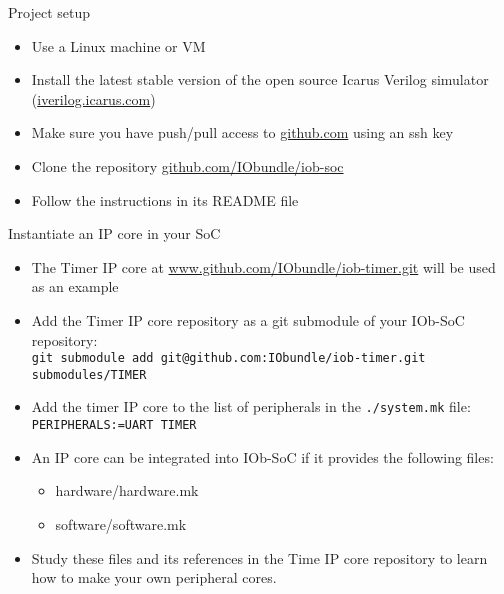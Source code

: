 \documentclass [xcolor=svgnames, t] {beamer}
\begin{document}
\begin{frame}{Project setup}
\begin{center}
  \begin{itemize}
    \item Use a Linux machine or VM
    \item Install the latest stable version of the open source Icarus Verilog simulator (\url{iverilog.icarus.com})
    \item Make sure you have push/pull access to \url{github.com} using an ssh
      key
    \item Clone the repository \url{github.com/IObundle/iob-soc}
    \item Follow the instructions in its README file
  \end{itemize}
\end{center}
\end{frame}


\begin{frame}{Instantiate an IP core in your SoC}
  \begin{itemize}
  \item The Timer IP core at \url{www.github.com/IObundle/iob-timer.git} will be used as an example
  \item Add the Timer IP core repository as a git submodule of your IOb-SoC repository:\\
    {\tt git submodule add git@github.com:IObundle/iob-timer.git submodules/TIMER}
  \item Add the timer IP core to the list of peripherals in the {\tt ./system.mk} file:\\
    {\tt PERIPHERALS:=UART TIMER}
  \item An IP core can be integrated into IOb-SoC if it provides the following files: 
    \begin{itemize}
    \item hardware/hardware.mk
    \item software/software.mk
    \end{itemize}
  \item Study these files and its references in the Time IP core repository to learn how to make your own peripheral cores.
  \end{itemize}
\end{frame}
\end{document}

